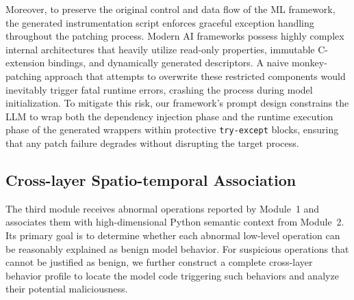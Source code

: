 Moreover, to preserve the original control and data flow of the ML framework, the generated instrumentation script enforces graceful exception handling throughout the patching process. Modern AI frameworks possess highly complex internal architectures that heavily utilize read-only properties, immutable C-extension bindings, and dynamically generated descriptors. A naive monkey-patching approach that attempts to overwrite these restricted components would inevitably trigger fatal runtime errors, crashing the process during model initialization. To mitigate this risk, our framework's prompt design constrains the LLM to wrap both the dependency injection phase and the runtime execution phase of the generated wrappers within protective \texttt{try-except} blocks, ensuring that any patch failure degrades without disrupting the target process.

\subsection{Cross-layer Spatio-temporal Association}
The third module receives abnormal operations reported by Module~1 and associates them with high-dimensional Python semantic context from Module~2. Its primary goal is to determine whether each abnormal low-level operation can be reasonably explained as benign model behavior. For suspicious operations that cannot be justified as benign, we further construct a complete cross-layer behavior profile to locate the model code triggering such behaviors and analyze their potential maliciousness.

